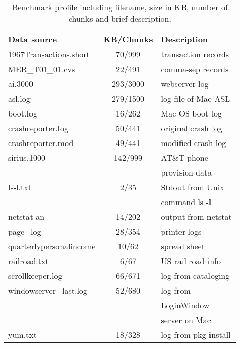 \begin{table}
\begin{center}
\begin{tabular}{|l||c|l|} \hline
Data source		& KB/Chunks		& Description\\ \hline \hline
1967Transactions.short	& 70/999		& transaction records\\ \hline
MER\_T01\_01.cvs	& 22/491 	& comma-sep records\\ \hline
ai.3000			& 293/3000	& webserver log\\ \hline
asl.log 		& 279/1500	& log file of Mac ASL\\ \hline	
boot.log		& 16/262		& Mac OS boot log\\ \hline
crashreporter.log 	& 50/441 	& original crash log\\ \hline 
crashreporter.mod 	& 49/441	& modified crash log\\ \hline
sirius.1000		& 142/999 	& AT\&T phone\\
			&		& provision data\\ \hline
ls-l.txt		& 2/35		& Stdout from Unix\\
			&		& command ls -l\\ \hline
netstat-an		& 14/202		& output from netstat\\ \hline
page\_log		& 28/354		& printer logs\\ \hline
quarterlypersonalincome	& 10/62		& spread sheet\\ \hline 
railroad.txt		& 6/67		& US rail road info\\ \hline
scrollkeeper.log 	& 66/671		& log from cataloging\\ \hline
windowserver\_last.log 	& 52/680		& log from\\
                        &               & LoginWindow\\
                        &               & server on Mac\\ \hline
yum.txt			& 18/328		& log from pkg install\\ \hline
\end{tabular}
\caption{Benchmark profile including filename, size in KB, number of chunks
and brief description.} \shrink
\label{tab:benchmarks} 
\end{center}
\end{table}

